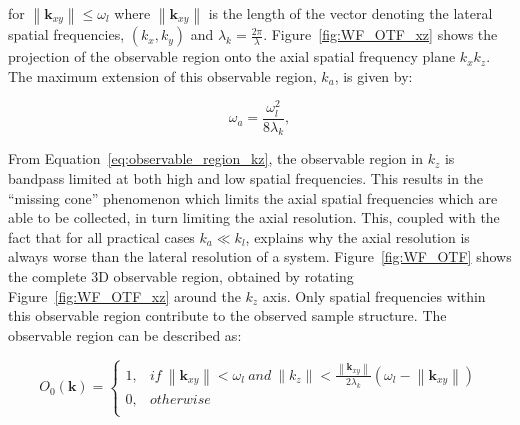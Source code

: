 for $\left\|\textbf{k}_{xy}\right\| \le \omega_{l}$ where 
$\left\|\textbf{k}_{xy}\right\|$ is the length of the vector denoting the 
lateral spatial frequencies, $(k_{x},k_{y})$ and $\lambda_{k} = 
\frac{2\pi}{\lambda}$\cite{frieden1967optical}. Figure~\ref{fig:WF_OTF_xz} shows 
the projection of the observable region onto the axial spatial frequency plane 
$k_{x}k_{z}$. The maximum extension of this observable region, $k_{a}$, is given 
by:

\begin{equation}\label{eq:axial_observable_max_k}
\omega_{a} = \frac{\omega_{l}^{2}}{8\lambda_{k}},
\end{equation}

From Equation~\ref{eq:observable_region_kz}, the observable
region in $k_{z}$ is bandpass limited at both high and low spatial frequencies.
This results in the ``missing cone'' phenomenon which limits the axial spatial 
frequencies which are able to be collected, in turn limiting the axial 
resolution\cite{behan2009three,arnison20023d}. This, coupled with the fact that
for all practical cases $k_{a} \ll k_{l}$, explains why the axial resolution is
always worse than the lateral resolution of a system. Figure~\ref{fig:WF_OTF} 
shows the complete 3D observable region, obtained by rotating 
Figure~\ref{fig:WF_OTF_xz} around the $k_{z}$ axis. Only spatial frequencies
within this observable region contribute to the observed sample structure.
The observable region can be described as:

\begin{equation}\label{eq:observable region}
O_{0}(\textbf{k}) = 
\begin{cases}
1, & if~ \left\|\textbf{k}_{xy}\right\| < \omega_{l} ~and~ \left\|k_{z}\right\| < \frac{\left\|\textbf{k}_{xy}\right\|}{2\lambda_{k}}(\omega_{l} - \left\|\textbf{k}_{xy}\right\|)\\
0, & otherwise\\
\end{cases}
\end{equation}

